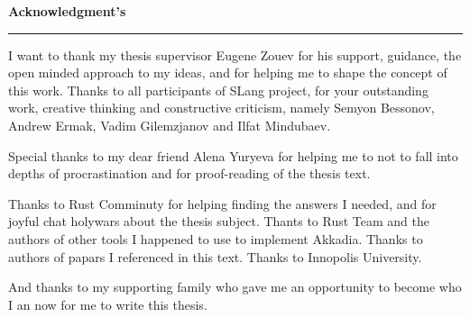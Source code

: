 \newpage
\thispagestyle{empty}


\begin{titlepage}


\begin{flushleft}
{\Large \bf
Acknowledgment's
}

\vspace{0.01cm}

\rule{\linewidth}{0.05cm}%

\end{flushleft}

{
I want to thank my thesis supervisor Eugene Zouev for his support, guidance, the open minded approach to my ideas,
and for helping me to shape the concept of this work.
Thanks to all participants of SLang project, for your outstanding work, creative thinking and constructive criticism, namely Semyon Bessonov,
Andrew Ermak, Vadim Gilemzjanov and Ilfat Mindubaev.

Special thanks to my dear friend Alena Yuryeva for helping me to not to fall into depths of procrastination and for proof-reading of the thesis text.

Thanks to Rust Comminuty for helping finding the answers I needed, and for joyful chat holywars about the thesis subject.
Thants to Rust Team and the authors of other tools I happened to use to implement Akkadia.
Thanks to authors of papars I referenced in this text.
Thanks to Innopolis University.

And thanks to my supporting family who gave me an opportunity to become who I an now for me to write this thesis.
}

\end{titlepage}
